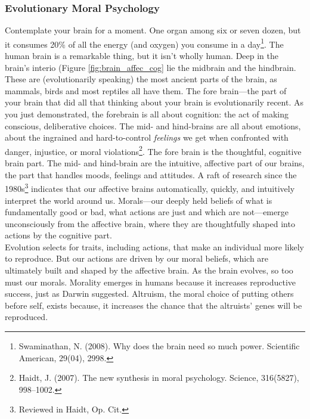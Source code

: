 \documentclass[amstex,12pt]{book}
\begin{document}
\subsubsection{Evolutionary Moral Psychology}
Contemplate your brain for a moment. One organ among six or seven dozen, but it consumes 20\% of all the energy (and oxygen) you consume in a day\footnote{Swaminathan, N. (2008). Why does the brain need so much power. Scientific American, 29(04), 2998.}. The human brain is a remarkable thing, but it isn't wholly human. Deep in the brain's interio (Figure \ref{fig:brain_affec_cog} lie the midbrain and the hindbrain. These are (evolutionarily speaking) the most ancient parts of the brain, as mammals, birds and most reptiles all have them. The fore brain---the part of your brain that did all that thinking about your brain is evolutionarily recent. As you just demonstrated, the forebrain is all about cognition: the act of making conscious, deliberative choices. The mid- and hind-brains are all about emotions, about the ingrained and hard-to-control \emph{feelings} we get when confronted with danger, injustice, or moral  violations\footnote{Haidt, J. (2007). The new synthesis in moral psychology. Science, 316(5827), 998–1002.}. The fore brain is the thoughtful, cognitive brain part. The mid- and hind-brain are the intuitive, affective part of our brains, the part that handles moods, feelings and attitudes. A raft of research since the 1980s\footnote{Reviewed in Haidt, Op. Cit.} indicates that our affective brains automatically, quickly, and intuitively interpret the world around us. Morals---our deeply held beliefs of what is fundamentally good or bad, what actions are just and which are not---emerge unconsciously from the affective brain, where they are thoughtfully shaped into actions by the cognitive part.\\
 
Evolution selects for traits, including actions, that make an individual more likely to reproduce. But our actions are driven by our moral beliefs, which are ultimately built and shaped by the affective brain. As the brain evolves, so too must our morals. Morality emerges in humans because it increases reproductive success, just as Darwin suggested. Altruism, the moral choice of putting others before self, exists because, it increases the chance that the altruists' genes will be reproduced.\\
\end{document}
